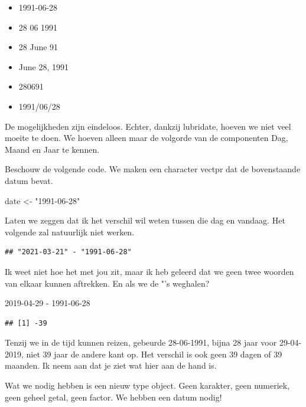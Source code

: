 \documentclass[]{tufte-book}
\newenvironment{Shaded}{}{}
\newcommand{\DecValTok}[1]{\textcolor[rgb]{0.25,0.63,0.44}{#1}}
\newcommand{\NormalTok}[1]{#1}
\newcommand{\OperatorTok}[1]{\textcolor[rgb]{0.40,0.40,0.40}{#1}}
\newcommand{\StringTok}[1]{\textcolor[rgb]{0.25,0.44,0.63}{#1}}
\providecommand{\tightlist}{%
  \setlength{\itemsep}{0pt}\setlength{\parskip}{0pt}}
\begin{document}
\begin{itemize}
\tightlist
\item
  1991-06-28
\item
  28 06 1991
\item
  28 June 91
\item
  June 28, 1991
\item
  280691
\item
  1991/06/28
\end{itemize}

De mogelijkheden zijn eindeloos. Echter, dankzij lubridate, hoeven we niet veel moeite te doen. We hoeven alleen maar de volgorde van de componenten Dag, Maand en Jaar te kennen.

Beschouw de volgende code. We maken een character vectpr dat de bovenstaande datum bevat.

\begin{Shaded}
\begin{Highlighting}[]
\NormalTok{date <-}\StringTok{ "1991-06-28"}
\end{Highlighting}
\end{Shaded}

Laten we zeggen dat ik het verschil wil weten tussen die dag en vandaag. Het volgende zal natuurlijk niet werken.

\begin{verbatim}
## "2021-03-21" - "1991-06-28"
\end{verbatim}

Ik weet niet hoe het met jou zit, maar ik heb geleerd dat we geen twee woorden van elkaar kunnen aftrekken. En als we de "'s weghalen?

\begin{Shaded}
\begin{Highlighting}[]
\DecValTok{2019-04-29} \OperatorTok{-}\StringTok{ }\DecValTok{1991-06-28}
\end{Highlighting}
\end{Shaded}

\begin{verbatim}
## [1] -39
\end{verbatim}

Tenzij we in de tijd kunnen reizen, gebeurde 28-06-1991, bijna 28 jaar voor 29-04-2019, niet 39 jaar de andere kant op. Het verschil is ook geen 39 dagen of 39 maanden. Ik neem aan dat je ziet wat hier aan de hand is.

Wat we nodig hebben is een nieuw type object. Geen karakter, geen numeriek, geen geheel getal, geen factor. We hebben een datum nodig!
\end{document}
